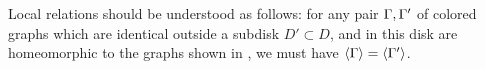 \begin{theorem}
\begin{enumerate}
    Local relations should be understood as follows: for any pair
    $\Gamma, \Gamma'$ of colored graphs which are identical outside a subdisk
	$D'\subset D$, and in this disk are homeomorphic to the graphs
    shown in , we must have $\langle\Gamma\rangle=\langle\Gamma'\rangle$.
   \end{enumerate}

\end{theorem}

